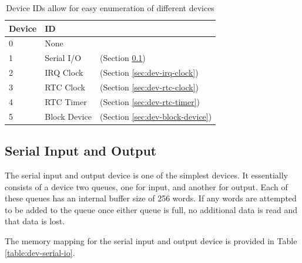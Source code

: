 \documentclass{article}
\begin{document}
\begin{table}[h!]
	\centering
	\begin{tabular}{l|ll}
		\hline
		Device & ID & {} \\
		\hline
		0 & None & {} \\
		1 & Serial I/O & (Section \ref{sec:dev-serial}) \\
		2 & IRQ Clock & (Section \ref{sec:dev-irq-clock}) \\
		3 & RTC Clock & (Section \ref{sec:dev-rtc-clock}) \\
		4 & RTC Timer & (Section \ref{sec:dev-rtc-timer}) \\
		5 & Block Device & (Section \ref{sec:dev-block-device}) \\
		\hline
	\end{tabular}
	\caption{Device IDs allow for easy enumeration of different devices}
	\label{table:dev-ids}
\end{table}

\subsection{Serial Input and Output}
\label{sec:dev-serial}

The serial input and output device is one of the simplest devices. It essentially consists of a device two queues, one for input, and another for output. Each of these queues has an internal buffer size of 256 words. If any words are attempted to be added to the queue once either queue is full, no additional data is read and that data is lost.

The memory mapping for the serial input and output device is provided in Table \ref{table:dev-serial-io}.
\end{document}
